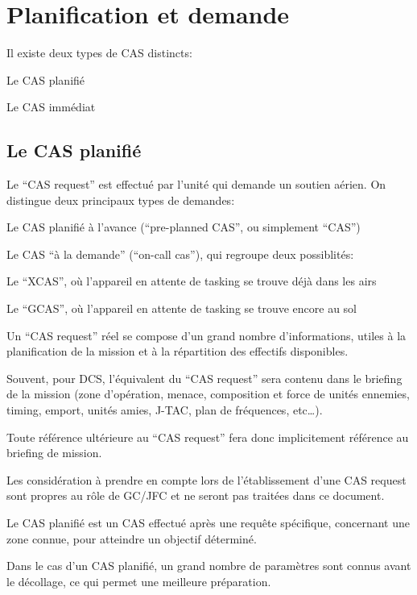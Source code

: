 \chapter{Planification et demande}

\e
    \item Il existe deux types de CAS distincts:
    \ee
        \item Le CAS planifié
        \item Le CAS immédiat
    \ed
\ed

\section{Le CAS planifié}

\e
    \item Le “CAS request” est effectué par l’unité qui demande un soutien aérien. On distingue deux principaux types de demandes:
    \ee
        \item Le CAS planifié à l’avance (“pre-planned CAS”, ou simplement “CAS”)
        \item Le CAS “à la demande” (“on-call cas”), qui regroupe deux possiblités:
        \eee
            \item Le “XCAS”, où l’appareil en attente de tasking se trouve déjà dans les airs
            \item Le “GCAS”, où l’appareil en attente de tasking se trouve encore au sol
        \ed
    \ed
    \item Un “CAS request” réel se compose d’un grand nombre d’informations, utiles à la planification de la mission et à la répartition des effectifs disponibles.
    \item
    Souvent, pour DCS, l’équivalent du “CAS request” sera contenu dans le briefing de la mission (zone d’opération, menace, composition et force de unités ennemies, timing, emport, unités amies, J-TAC, plan de fréquences, etc…).
    \item Toute référence ultérieure au “CAS request” fera donc implicitement référence au briefing de mission.
    \item Les considération à prendre en compte lors de l’établissement d’une CAS request sont propres au rôle de GC/JFC et ne seront pas traitées dans ce document.
    \item Le CAS planifié est un CAS effectué après une requête spécifique, concernant une zone connue, pour atteindre un objectif déterminé.
    \item Dans le cas d’un CAS planifié, un grand nombre de paramètres sont connus avant le décollage, ce qui permet une meilleure préparation.
\ed

